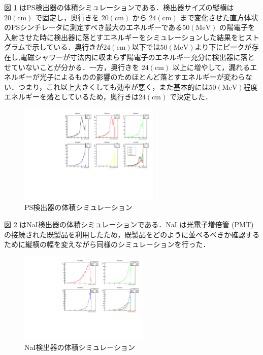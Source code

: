 図 \ref{PS_sim} はPS検出器の体積シミュレーションである．検出器サイズの縦横は $20 (\mathrm{cm})$ で固定し，奥行きを $20 (\mathrm{cm})$ から $24 (\mathrm{cm})$ まで変化させた直方体状のPSシンチレータに測定すべき最大のエネルギーである$50 (\mathrm{MeV})$ の陽電子を入射させた時に検出器に落とすエネルギーをシミュレーションした結果をヒストグラムで示している．奥行きが$24 (\mathrm{cm})$以下では$50 (\mathrm{MeV})$より下にピークが存在し,電磁シャワーが寸法内に収まらず陽電子のエネルギー充分に検出器に落とせていないことが分かる．一方，奥行きを $24 (\mathrm{cm})$ 以上に増やして，漏れるエネルギーが光子によるものの影響のためほとんど落とすエネルギーが変わらない．つまり，これ以上大きくしても効率が悪く，また基本的には$50 (\mathrm{MeV})$程度エネルギーを落としているため，奥行きは$24 (\mathrm{cm})$ で決定した．

  \begin{figure}[H]
    \centering
    \includegraphics[width=0.6\textwidth,angle=-90]{figure/hayakawa/pl_20_24.pdf}
    \caption{PS検出器の体積シミュレーション}
    \label{PS_sim}
  \end{figure}

図 \ref{NaI_sim} はNaI検出器の体積シミュレーションである．NaI は光電子増倍管 (PMT) の接続された既製品を利用したため，既製品をどのように並べるべきか確認するために縦横の幅を変えながら同様のシミュレーションを行った．

  \begin{figure}[H]
    \centering
    \includegraphics[width=0.55\textwidth,angle=-90]{figure/hayakawa/NaI_10_20.pdf}
    \caption{NaI検出器の体積シミュレーション}
    \label{NaI_sim}
  \end{figure}

